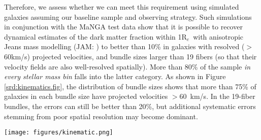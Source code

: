 \documentclass[preprint,11pt]{aastex}
\newcommand{\Reff}{{R$_{e}$}}
\begin{document}
Therefore, we assess whether we can meet this requirement using
simulated galaxies assuming our baseline sample and observing
strategy. Such simulations in conjunction with the MaNGA test data
show that it is possible to recover dynamical estimates of the dark
matter fraction within 1\Reff\ with anisotropic Jeans mass modelling
(JAM: \citealt{cappellari2008}) to better than 10\% in galaxies with
resolved ($>$60km/s) projected velocities, and bundle sizes larger
than 19 fibers (so that their velocity fields are also well-resolved
spatially). More than 80\% of the sample {\em in every stellar mass
  bin} falls into the latter category. As shown in Figure
\ref{srd:kinematics.fig}, the distribution of bundle sizes shows that
more than 75\% of galaxies in each bundle size have projected
velocities $>60$~km/s. In the 19-fiber bundles, the errors can still
be better than 20\%, but additional systematic errors stemming from
poor spatial resolution may become dominant.

\begin{figure*}[htb]
\begin{center}
\texttt{[image: figures/kinematic.png]}
\vspace*{0cm}
\caption{\small Projected kinematics (left) and a prediction of 
  possible mass-precision with JAM (right) for the MaNGA Primary sample. The left panel
  illustrates the expected distribution of {\it projected} rotation
  speed at a radius enclosing 80\% of the $i$-band light, V80,  based on the
  baryonic Tully-Fisher relation from \citet{reyes2011}. The instrumental resolution
  of $\sigma \sim 63$ km/s is shown (blue, vertical line). Different curves
  show subsets observed in different bundle sizes. Roughly
  80\% of all MaNGA galaxies are expected to have a projected V80
  above the instrumental resolution. The right panel shows the fraction
  of galaxies which will be available for high-precision mass-decompositions, using JAM (i.e. having $V80>63$ km/s and not in the smallest bundle) . 
  Lower-mass galaxies will have
  lower-precision dynamical estimates of their stellar mass on
  average, but at least 30-40\% of even the lowest-mass galaxies in
  the survey may be able to yield stellar mass estimates to better
  than 10\% (random error).}
\label{srd:kinematics.fig}
\end{center}
\end{figure*}

\end{document}
